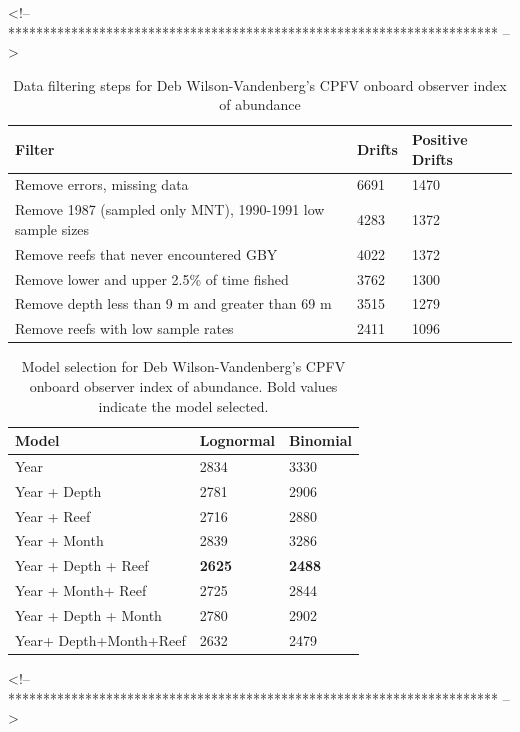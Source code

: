 \documentclass[12pt,]{article}
\begin{document}
\FloatBarrier
<!-- ********************************************************************** -->

\begin{table}[ht]
\centering
\caption{Data filtering steps for Deb Wilson-Vandenberg's CPFV onboard observer 
                                        index of abundance} 
\label{tab:Fleet5_Filter}
\begin{tabular}{lll}
  \hline
Filter & Drifts & Positive Drifts \\ 
  \hline
Remove errors, missing data & 6691 & 1470 \\ 
  Remove 1987 (sampled only MNT), 1990-1991 low sample sizes & 4283 & 1372 \\ 
  Remove reefs that never encountered GBY & 4022 & 1372 \\ 
  Remove lower and upper 2.5\% of time fished & 3762 & 1300 \\ 
  Remove depth less than 9 m and greater than 69 m & 3515 & 1279 \\ 
  Remove reefs with low sample rates & 2411 & 1096 \\ 
   \hline
\end{tabular}
\end{table}\begin{table}[ht]
\centering
\caption{Model selection for Deb Wilson-Vandenberg's CPFV onboard observer 
                                        index of abundance. Bold values indicate the model selected.} 
\label{tab:Fleet5_AIC}
\begin{tabular}{lll}
  \hline
Model & Lognormal & Binomial \\ 
  \hline
Year & 2834 & 3330 \\ 
  Year + Depth & 2781 & 2906 \\ 
  Year + Reef & 2716 & 2880 \\ 
  Year + Month & 2839 & 3286 \\ 
  Year + Depth + Reef & \textbf{2625} & \textbf{2488} \\ 
  Year + Month+ Reef & 2725 & 2844 \\ 
  Year + Depth + Month & 2780 & 2902 \\ 
  Year+ Depth+Month+Reef & 2632 & 2479 \\ 
   \hline
\end{tabular}
\end{table}

\FloatBarrier
<!-- ********************************************************************** -->
\end{document}
